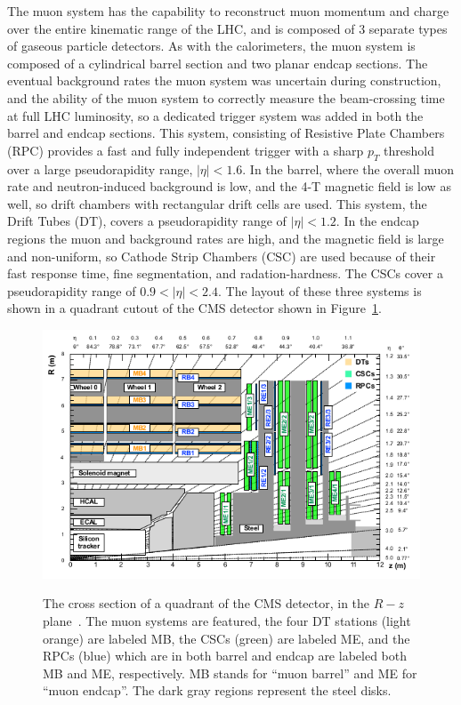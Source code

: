 The muon system has the capability to reconstruct muon momentum and charge over the entire kinematic range of the LHC, and is composed of 3 separate types of gaseous particle detectors.  As with the calorimeters, the muon system is composed of a cylindrical barrel section and two planar endcap sections.  The eventual background rates the muon system was uncertain during construction, and the ability of the muon system to correctly measure the beam-crossing time at full LHC luminosity, so a dedicated trigger system was added in both the barrel and endcap sections.  This system, consisting of Resistive Plate Chambers (RPC) provides a fast and fully independent trigger with a sharp $p_T$ threshold over a large pseudorapidity range, $|\eta|< 1.6$.  In the barrel, where the overall muon rate and neutron-induced background is low, and the 4-T magnetic field is low as well, so drift chambers with rectangular drift cells are used.  This system, the Drift Tubes (DT), covers a pseudorapidity range of $|\eta| < 1.2$.  In the endcap regions the muon and background rates are high, and the magnetic field is large and non-uniform, so Cathode Strip Chambers (CSC) are used because of their fast response time, fine segmentation, and radation-hardness.  The CSCs cover a pseudorapidity range of $0.9 < |\eta| < 2.4$.  The layout of these three systems is shown in a quadrant cutout of the CMS detector shown in Figure~\ref{figapp:Muoncutout}.





\begin{figure}[!Hh]
       \includegraphics[scale=0.8]{Figures/Muoncutout.png} \\
       \caption[The layout of the CMS muon system.]{The cross section of a quadrant of the CMS detector, in the $R-z$ plane~\cite{CMSperformance}.  The muon systems are featured, the four DT stations (light orange) are labeled MB, the CSCs (green) are labeled ME, and the RPCs (blue) which are in both barrel and endcap are labeled both MB and ME, respectively.  MB stands for ``muon barrel'' and ME for ``muon endcap''.  The dark gray regions represent the steel disks.}
\label{figapp:Muoncutout}
\end{figure}


